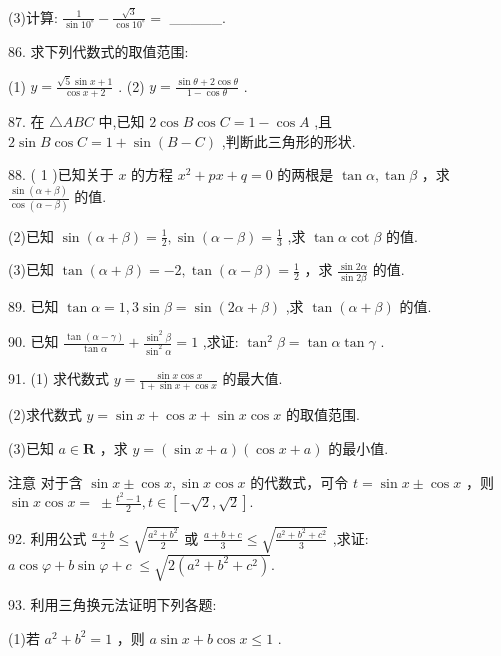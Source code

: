 \documentclass[10pt]{article}
\begin{document}
(3)计算: \(\frac{1}{\sin {10}^{ \circ  }} - \frac{\sqrt{3}}{\cos {10}^{ \circ  }} =\) \_\_\_\_\_.

86. 求下列代数式的取值范围:

(1) \(y = \frac{\sqrt{5}\sin x + 1}{\cos x + 2}\) . (2) \(y = \frac{\sin \theta  + 2\cos \theta }{1 - \cos \theta }\) .

87. 在 \(\bigtriangleup {ABC}\) 中,已知 \(2\cos B\cos C = 1 - \cos A\) ,且 \(2\sin B\cos C = 1 + \sin \left( {B - C}\right)\) ,判断此三角形的形状.

88. ( 1 )已知关于 \(x\) 的方程 \({x}^{2} + {px} + q = 0\) 的两根是 \(\tan \alpha ,\tan \beta\) ，求 \(\frac{\sin \left( {\alpha  + \beta }\right) }{\cos \left( {\alpha  - \beta }\right) }\) 的值.

(2)已知 \(\sin \left( {\alpha  + \beta }\right)  = \frac{1}{2},\sin \left( {\alpha  - \beta }\right)  = \frac{1}{3}\) ,求 \(\tan \alpha \cot \beta\) 的值.

(3)已知 \(\tan \left( {\alpha  + \beta }\right)  =  - 2,\tan \left( {\alpha  - \beta }\right)  = \frac{1}{2}\) ，求 \(\frac{\sin {2\alpha }}{\sin {2\beta }}\) 的值.

89. 已知 \(\tan \alpha  = 1,3\sin \beta  = \sin \left( {{2\alpha } + \beta }\right)\) ,求 \(\tan \left( {\alpha  + \beta }\right)\) 的值.

90. 已知 \(\frac{\tan \left( {\alpha  - \gamma }\right) }{\tan \alpha } + \frac{{\sin }^{2}\beta }{{\sin }^{2}\alpha } = 1\) ,求证: \({\tan }^{2}\beta  = \tan \alpha \tan \gamma\) .

91. (1) 求代数式 \(y = \frac{\sin x\cos x}{1 + \sin x + \cos x}\) 的最大值.

(2)求代数式 \(y = \sin x + \cos x + \sin x\cos x\) 的取值范围.

(3)已知 \(a \in  \mathbf{R}\) ，求 \(y = \left( {\sin x + a}\right) \left( {\cos x + a}\right)\) 的最小值.

注意 对于含 \(\sin x \pm  \cos x,\sin x\cos x\) 的代数式，可令 \(t = \sin x \pm  \cos x\) ，则 \(\sin x\cos x = \; \pm  \frac{{t}^{2} - 1}{2},t \in  \left\lbrack  {-\sqrt{2},\sqrt{2}}\right\rbrack  .\)

92. 利用公式 \(\frac{a + b}{2} \leq  \sqrt{\frac{{a}^{2} + {b}^{2}}{2}}\) 或 \(\frac{a + b + c}{3} \leq  \sqrt{\frac{{a}^{2} + {b}^{2} + {c}^{2}}{3}}\) ,求证: \(a\cos \varphi  + b\sin \varphi  + c \; \leq  \sqrt{2\left( {{a}^{2} + {b}^{2} + {c}^{2}}\right) }.\)

93. 利用三角换元法证明下列各题:

(1)若 \({a}^{2} + {b}^{2} = 1\) ，则 \(a\sin x + b\cos x \leq  1\) .
\end{document}
